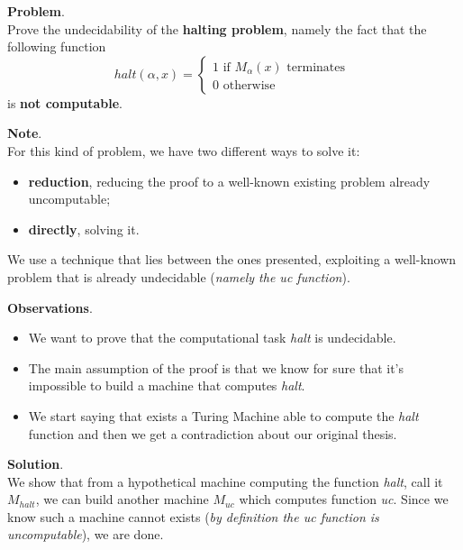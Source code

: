 \begin{example}[title = Undecidability halting problem]
    \textbf{Problem}. \\
    Prove the undecidability of the \textbf{halting problem}, namely the fact that the following function
    $$ halt(\alpha, x) = \begin{cases} 1 \text{ if } M_{\alpha}(x) \text{ terminates } \\ 0 \text{ otherwise }\end{cases} $$
    is \textbf{not computable}. \vspace{14pt}

    \textbf{Note}. \\
    For this kind of problem, we have two different ways to solve it:
    \begin{itemize}
        \renewcommand{\labelitemi}{-}
        \item \textbf{reduction}, reducing the proof to a well-known existing problem already uncomputable;
        \item \textbf{directly}, solving it.
    \end{itemize}
    We use a technique that lies between the ones presented, exploiting a well-known problem that is already undecidable (\textit{namely the uc function}). \vspace{14pt}

    \textbf{Observations}.
    \begin{itemize}
        \renewcommand{\labelitemi}{-}
        \item We want to prove that the computational task \textit{halt} is undecidable.
        \item The main assumption of the proof is that we know for sure that it's impossible to build a machine that computes \textit{halt}.
        \item We start saying that exists a Turing Machine able to compute the \textit{halt} function and then we get a contradiction about our original thesis.
    \end{itemize} \vspace{14pt}

    \textbf{Solution}. \\
    We show that from a hypothetical machine computing the function \textit{halt}, call it $M_{halt}$, we can build another machine $M_{uc}$ which computes function
    \textit{uc}. Since we know such a machine cannot exists (\textit{by definition the uc function is uncomputable}), we are done. \vspace{7pt}


\end{example}
